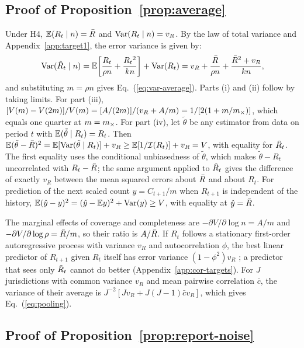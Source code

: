 \subsection{Proof of Proposition~\ref{prop:average}}
\label{app:prop1}

Under H4, $\mathbb{E}(R_t\mid n)=\bar{R}$ and $\mathrm{Var}(R_t\mid n)=v_R$. By the law of total variance and Appendix~\ref{app:target1}, the error variance is given by:
\begin{equation}
  \Var(\Rhat_t\mid n)=\E\!\left[\frac{R_t}{\rho n}+\frac{R_t{}^2}{kn}\right]+\Var(R_t)=v_R+\frac{\Rbar}{\rho n}+\frac{\Rbar^2+v_R}{kn},
\end{equation}
and substituting $m=\rho n$ gives Eq.~(\ref{eq:var-average}). Parts (i) and (ii) follow by taking limits. For part (iii), $[V(m)-V(2m)]/V(m)=[A/(2m)]/(v_R+A/m)=1/[2(1+m/m_{\times})]$, which equals one quarter at $m=m_{\times}$. For part (iv), let $\tilde{\theta}$ be any estimator from data on period $t$ with $\mathbb{E}(\tilde{\theta}\mid R_t)=R_t$. Then $\mathbb{E}(\tilde{\theta}-\bar{R})^2=\mathbb{E}[\mathrm{Var}(\tilde{\theta}\mid R_t)]+v_R\ge\mathbb{E}[1/\mathcal{I}(R_t)]+v_R=V$, with equality for $\Rhat_t$. The first equality uses the conditional unbiasedness of $\tilde{\theta}$, which makes $\tilde{\theta}-R_t$ uncorrelated with $R_t-\bar{R}$; the same argument applied to $\Rhat_t$ gives the difference of exactly $v_R$ between the mean squared errors about $\bar{R}$ and about $R_t$. For prediction of the next scaled count $y=C_{t+1}/m$ when $R_{t+1}$ is independent of the history, $\mathbb{E}(\hat{y}-y)^2=(\hat{y}-\mathbb{E} y)^2+\mathrm{Var}(y)\ge V$, with equality at $\hat{y}=\bar{R}$.

The marginal effects of coverage and completeness are $-\partial V/\partial\log n=A/m$ and $-\partial V/\partial\log\rho=\bar{R}/m$, so their ratio is $A/\bar{R}$. If $R_t$ follows a stationary first-order autoregressive process with variance $v_R$ and autocorrelation $\phi$, the best linear predictor of $R_{t+1}$ given $R_t$ itself has error variance $(1-\phi^2)v_R$ \citep{hamilton1994time}; a predictor that sees only $\Rhat_t$ cannot do better (Appendix~\ref{app:cor-targets}). For $J$ jurisdictions with common variance $v_R$ and mean pairwise correlation $\bar{c}$, the variance of their average is $J^{-2}[Jv_R+J(J-1)\bar{c}v_R]$, which gives Eq.~(\ref{eq:pooling}).

\subsection{Proof of Proposition~\ref{prop:report-noise}}
\label{app:prop2}

